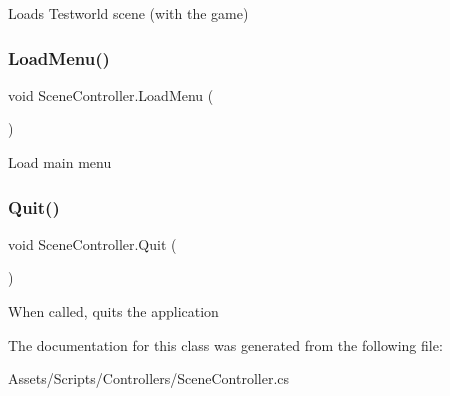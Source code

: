 Loads Testworld scene (with the game) \mbox{\label{class_scene_controller_a4fb5d32427ebae6e59dc136a3a15d07c}} 
\subsubsection{\texorpdfstring{Load\+Menu()}{LoadMenu()}}
{\footnotesize\ttfamily void Scene\+Controller.\+Load\+Menu (\begin{DoxyParamCaption}{ }\end{DoxyParamCaption})}

Load main menu \mbox{\label{class_scene_controller_a9b24f2313df6b1ee47e72a978fc3528d}} 
\subsubsection{\texorpdfstring{Quit()}{Quit()}}
{\footnotesize\ttfamily void Scene\+Controller.\+Quit (\begin{DoxyParamCaption}{ }\end{DoxyParamCaption})}

When called, quits the application 

The documentation for this class was generated from the following file\+:\begin{DoxyCompactItemize}
\item 
Assets/\+Scripts/\+Controllers/Scene\+Controller.\+cs\end{DoxyCompactItemize}
